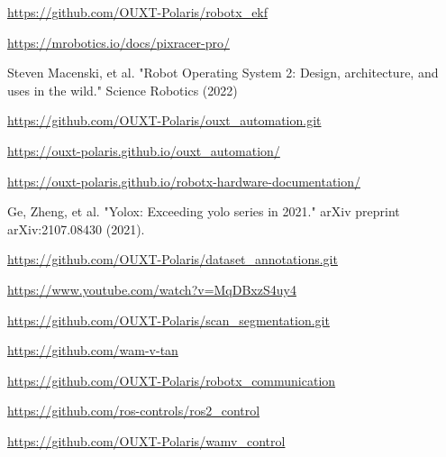 \documentclass[lettersize,journal]{IEEEtran}
\begin{document}
\begin{thebibliography}{1}

    \url{https://github.com/OUXT-Polaris/robotx_ekf}

    \url{https://mrobotics.io/docs/pixracer-pro/}

    Steven Macenski, et al. "Robot Operating System 2: Design, architecture, and uses in the wild." Science Robotics (2022)

    \url{https://github.com/OUXT-Polaris/ouxt_automation.git}

    \url{https://ouxt-polaris.github.io/ouxt_automation/}

    \url{https://ouxt-polaris.github.io/robotx-hardware-documentation/}

    Ge, Zheng, et al. "Yolox: Exceeding yolo series in 2021." arXiv preprint arXiv:2107.08430 (2021).

    \url{https://github.com/OUXT-Polaris/dataset_annotations.git}

    \url{https://www.youtube.com/watch?v=MqDBxzS4uy4}

    \url{https://github.com/OUXT-Polaris/scan_segmentation.git}

    \url{https://github.com/wam-v-tan}

    \url{https://github.com/OUXT-Polaris/robotx_communication}

    \url{https://github.com/ros-controls/ros2_control}

    \url{https://github.com/OUXT-Polaris/wamv_control}

\end{thebibliography}

\vfill
\end{document}
